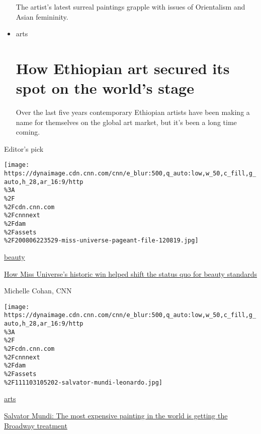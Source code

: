 \begin{itemize}
  \href{/style/article/dominique-fung-paintings-artsy/index.html}{}

  The artist's latest surreal paintings grapple with issues of
  Orientalism and Asian femininity.
\item
  \href{/style/arts}{}

  arts

  \href{/style/article/ethiopian-art-has-secured-its-spot-on-the-worlds-stage/index.html}{}

  \hypertarget{how-ethiopian-art-secured-its-spot-on-the-worlds-stage}{%
  \section{How Ethiopian art secured its spot on the world's
  stage}\label{how-ethiopian-art-secured-its-spot-on-the-worlds-stage}}

  \href{/style/article/ethiopian-art-has-secured-its-spot-on-the-worlds-stage/index.html}{}

  Over the last five years contemporary Ethiopian artists have been
  making a name for themselves on the global art market, but it's been a
  long time coming.
\end{itemize}

Editor's pick

\href{/style/article/zozibini-tunzi-miss-universe-south-africa-beauty-spc-intl/index.html}{}

\texttt{[image: https://dynaimage.cdn.cnn.com/cnn/e\_blur:500,q\_auto:low,w\_50,c\_fill,g\_auto,h\_28,ar\_16:9/http\\\%3A\\\%2F\\\%2Fcdn.cnn.com\\\%2Fcnnnext\\\%2Fdam\\\%2Fassets\\\%2F200806223529-miss-universe-pageant-file-120819.jpg]}

\href{/style/beauty}{beauty}

\href{/style/article/zozibini-tunzi-miss-universe-south-africa-beauty-spc-intl/index.html}{How
Miss Universe's historic win helped shift the status quo for beauty
standards}

Michelle Cohan, CNN

\href{/style/article/salvator-mundi-leonardo-da-vinci-musical/index.html}{}

\texttt{[image: https://dynaimage.cdn.cnn.com/cnn/e\_blur:500,q\_auto:low,w\_50,c\_fill,g\_auto,h\_28,ar\_16:9/http\\\%3A\\\%2F\\\%2Fcdn.cnn.com\\\%2Fcnnnext\\\%2Fdam\\\%2Fassets\\\%2F111103105202-salvator-mundi-leonardo.jpg]}

\href{/style/arts}{arts}

\href{/style/article/salvator-mundi-leonardo-da-vinci-musical/index.html}{Salvator
Mundi: The most expensive painting in the world is getting the Broadway
treatment}


